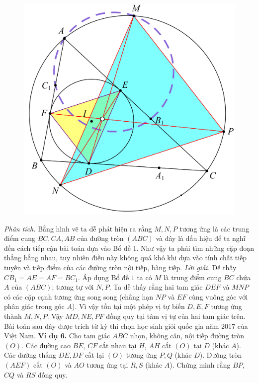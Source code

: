 \begin{multicols}{2}
\begin{figure}[H]
		\vspace*{-5pt}
		\centering
		\captionsetup{labelformat= empty, justification=centering}
		\includegraphics[width= 0.9\linewidth]{11}
		\vspace*{-10pt}
	\end{figure}
	\textit{Phân tích.} Bằng hình vẽ ta dễ phát hiện ra rằng $M,N,P$ tương ứng là các trung điểm cung $BC,CA,AB$ của đường tròn $(ABC)$ và đây là dấu hiệu để ta nghĩ đến cách tiếp cận bài toán dựa vào Bổ đề $1$. Như vậy ta phải tìm những cặp đoạn thẳng bằng nhau, tuy nhiên điều này không quá khó khi dựa vào tính chất tiếp tuyến và tiếp điểm của các đường tròn nội tiếp, bàng tiếp.
	\vskip 0.1cm
	\textit{Lời giải.} Dễ thấy $CB_1 =AE=AF=BC_1$. Áp dụng Bổ đề $1$ ta có $M$ là trung điểm cung $BC$ chứa $A$ của $(ABC)$; tương tự với $N,P.$ Ta dễ thấy rằng hai tam giác $DEF$ và $MNP$ có các cặp cạnh tương ứng song song (chẳng hạn $NP$ và $EF$ cùng vuông góc với phân giác trong góc $A$). Vì vậy tồn tại một phép vị tự biến $D,E,F$ tương ứng thành $M,N,P$. Vậy $MD,NE,PF$ đồng quy tại tâm vị tự của hai tam giác trên. 
	\vskip 0.1cm
	Bài toán sau đây được trích từ kỳ thi chọn học sinh giỏi quốc gia năm 2017 của Việt Nam.
	\textbf{\color{hoccungpi}Ví dụ 6.} Cho tam giác $ABC$ nhọn, không cân, nội tiếp đường tròn $(O)$. Các đường cao $BE$, $CF$ cắt nhau tại $H$, $AH$ cắt $(O)$ tại $D$  (khác $A$). Các đường thẳng $DE,DF$ cắt lại $(O)$ tương ứng  $P,Q$ (khác $D$). Đường tròn $(AEF)$ cắt $(O)$ và $AO$ tương ứng tại $R,S$ (khác $A$). Chứng minh rằng $BP$, $CQ$ và $RS$ đồng quy.

\end{multicols}
